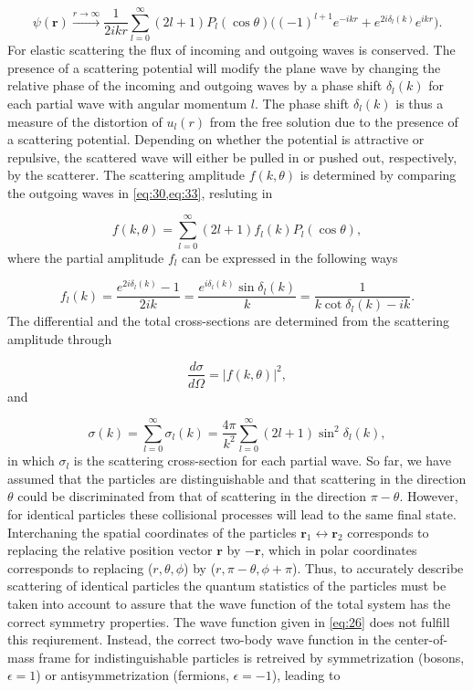 \documentclass{article}
\providecommand{\abs}[1]{\lvert#1\rvert} \providecommand{\norm}[1]{\lVert#1\rVert}
\numberwithin{equation}{section}
\numberwithin{figure}{section}
\begin{document}
\begin{equation}\label{eq:33}
\psi(\mathbf{r}) \xrightarrow{r \to \infty} \frac{1}{2ikr} \sum_{l=0}^{\infty} (2l+1) P_l(\cos\theta)\big((-1)^{l+1}e^{-ikr} + e^{2i\delta_l(k)}e^{ikr}\big).
\end{equation}
For elastic scattering the flux of incoming and outgoing waves is conserved. The presence of a scattering potential will modify the plane wave by changing the relative phase of the incoming and outgoing waves by a phase shift $\delta_l(k)$ for each partial wave with angular momentum $l$. The phase shift $\delta_l(k)$ is thus a measure of the distortion of $u_l(r)$ from the free solution due to the presence of a scattering potential. Depending on whether the potential is attractive or repulsive, the scattered wave will either be pulled in or pushed out, respectively, by the scatterer. The scattering amplitude $f(k,\theta)$ is determined by comparing the outgoing waves in \cref{eq:30,eq:33}, resluting in

\begin{equation}
f(k,\theta) = \sum_{l=0}^{\infty} (2l+1)f_l(k)P_l(\cos\theta),
\end{equation}
where the partial amplitude $f_l$ can be expressed in the following ways

\begin{equation}\label{eq:partialamp}
f_l(k) = \frac{e^{2i\delta_l(k)}-1}{2ik} = \frac{e^{i\delta_l(k)}\sin\delta_l(k)}{k} = \frac{1}{k\cot\delta_l(k) - ik}. 
\end{equation}
The differential and the total cross-sections are determined from the scattering amplitude through 

\begin{equation}
\frac{d\sigma}{d\Omega}=\abs{f(k,\theta)}^2,
\end{equation}
and

\begin{equation}
\sigma(k)= \sum_{l=0}^{\infty} \sigma_l(k) = \frac{4\pi}{k^2}\sum_{l=0}^{\infty}(2l+1)\sin^2\delta_l(k),
\end{equation}
in which $\sigma_l$ is the scattering cross-section for each partial wave. So far, we have assumed that the particles are distinguishable and that scattering in the direction $\theta$ could be discriminated from that of scattering in the direction $\pi-\theta$. However, for identical particles these collisional processes will lead to the same final state. Interchaning the spatial coordinates of the particles $\mathbf{r}_1 \leftrightarrow \mathbf{r}_2$ corresponds to replacing the relative position vector $\mathbf{r}$ by $-\mathbf{r}$, which in polar coordinates corresponds to replacing ($r,\theta,\phi$) by ($r,\pi-\theta,\phi+\pi$). Thus, to accurately describe scattering of identical particles the quantum statistics of the particles must be taken into account to assure that the wave function of the total system has the correct symmetry properties. The wave function given in \eqref{eq:26} does not fulfill this reqiurement. Instead, the correct two-body wave function in the center-of-mass frame for indistinguishable particles is retreived by symmetrization (bosons, $\epsilon = 1$) or antisymmetrization (fermions, $\epsilon = -1$), leading to
\end{document}

